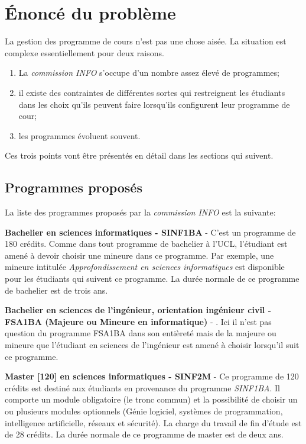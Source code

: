 \chapter{Énoncé du problème}
\label{ennonce}
La gestion des programme de cours n'est pas une chose aisée. La situation est complexe essentiellement pour deux raisons.
\begin{enumerate}
\item La \textit{commission INFO} s'occupe d'un nombre assez élevé de programmes;
\item il existe des contraintes de différentes sortes qui restreignent les étudiants dans les choix qu'ils peuvent faire lorsqu'ils configurent leur programme de cour;
\item les programmes évoluent souvent.
\end{enumerate}

Ces trois points vont être présentés en détail dans les sections qui suivent. 


\section{Programmes proposés}
La liste des programmes proposés par la \textit{commission INFO} est la suivante:


\textbf{Bachelier en sciences informatiques - SINF1BA} \cite{SINF1BA} - C'est un programme de 180 crédits. Comme dans tout programme de bachelier à l'UCL, l'étudiant est amené à devoir choisir une mineure dans ce programme. Par exemple, une mineure intitulée \textit{Approfondissement en sciences informatiques} est disponible pour les étudiants qui suivent ce programme. La durée normale de ce programme de bachelier est de trois ans. 

\textbf{Bachelier en sciences de l'ingénieur, orientation ingénieur civil - FSA1BA (Majeure ou Mineure en informatique)} - \cite{FSA1BA}. Ici il n'est pas question du programme FSA1BA dans son entièreté mais de la majeure ou mineure que l'étudiant en sciences de l'ingénieur est amené à choisir lorsqu'il suit ce programme.

\textbf{Master [120] en sciences informatiques - SINF2M} \cite{SINF2M} - Ce programme de 120 crédits est destiné aux étudiants en provenance du programme \textit{SINF1BA}. Il comporte un module obligatoire (le tronc commun) et la possibilité de choisir un ou plusieurs modules optionnels (Génie logiciel, systèmes de programmation, intelligence artificielle, réseaux et sécurité). La charge du travail de fin d'étude est de 28 crédits. La durée normale de ce programme de master est de deux ans.

